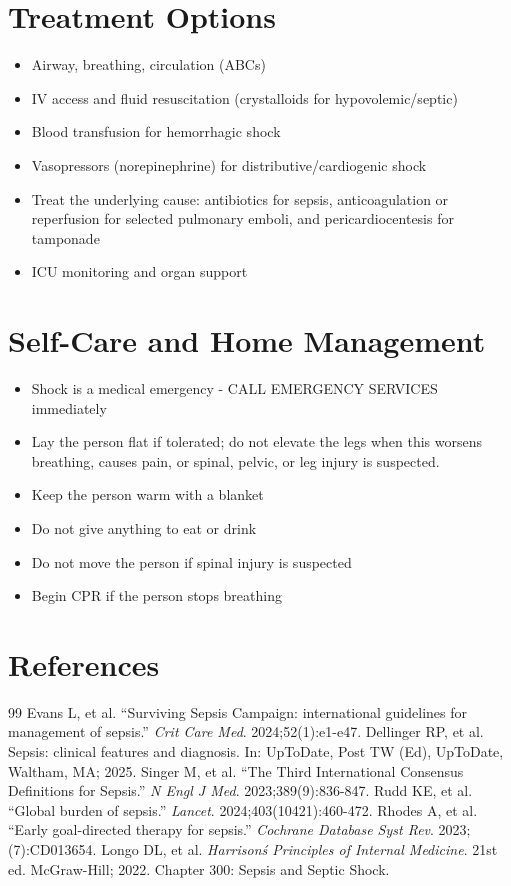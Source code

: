 \section*{Treatment Options}
\begin{itemize}
\item Airway, breathing, circulation (ABCs)
\item IV access and fluid resuscitation (crystalloids for hypovolemic/septic)
\item Blood transfusion for hemorrhagic shock
\item Vasopressors (norepinephrine) for distributive/cardiogenic shock
\item Treat the underlying cause: antibiotics for sepsis, anticoagulation or reperfusion for selected pulmonary emboli, and pericardiocentesis for tamponade
\item ICU monitoring and organ support
\end{itemize}

\section*{Self-Care and Home Management}
\begin{itemize}
\item Shock is a medical emergency - CALL EMERGENCY SERVICES immediately
\item Lay the person flat if tolerated; do not elevate the legs when this worsens breathing, causes pain, or spinal, pelvic, or leg injury is suspected.
\item Keep the person warm with a blanket
\item Do not give anything to eat or drink
\item Do not move the person if spinal injury is suspected
\item Begin CPR if the person stops breathing
\end{itemize}

\section*{References}
\begin{thebibliography}{99}
 Evans L, et al. ``Surviving Sepsis Campaign: international guidelines for management of sepsis.'' \emph{Crit Care Med}. 2024;52(1):e1-e47.
 Dellinger RP, et al. Sepsis: clinical features and diagnosis. In: UpToDate, Post TW (Ed), UpToDate, Waltham, MA; 2025.
 Singer M, et al. ``The Third International Consensus Definitions for Sepsis.'' \emph{N Engl J Med}. 2023;389(9):836-847.
 Rudd KE, et al. ``Global burden of sepsis.'' \emph{Lancet}. 2024;403(10421):460-472.
 Rhodes A, et al. ``Early goal-directed therapy for sepsis.'' \emph{Cochrane Database Syst Rev}. 2023;(7):CD013654.
 Longo DL, et al. \emph{Harrison\'s Principles of Internal Medicine}. 21st ed. McGraw-Hill; 2022. Chapter 300: Sepsis and Septic Shock.
\end{thebibliography}

